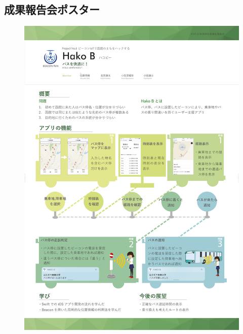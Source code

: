 \documentclass[openany,11pt,papersize]{jsbook}
\begin{document}
\begin{appendix}
\chapter{成果報告会ポスター}
\begin{figure}[htbp]
  \begin{center}
    \includegraphics[clip,width=14cm]{img/final_poster.png}
    \label{fig:poster}
  \end{center}
\end{figure}
  
  \end{appendix}
  
  

  \printbibliography[title=参考文献]
  
  
\end{document}
